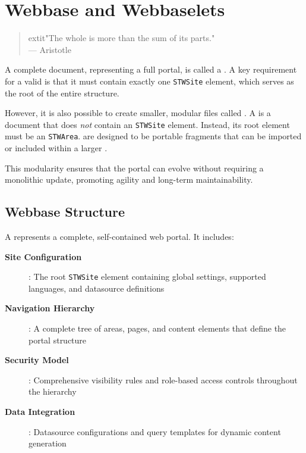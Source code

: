 
\chapter{Webbase and Webbaselets}
\label{chap:webbaselets}

\begin{quote}
	extit{"The whole is more than the sum of its parts."} \\
— Aristotle
\end{quote}

A complete \wbdl{} document, representing a full portal, is called a \textbf{\webbase{}}. A key requirement for a valid \webbase{} is that it must contain exactly one \texttt{STWSite} element, which serves as the root of the entire structure.

However, it is also possible to create smaller, modular \wbdl{} files called \textbf{}. A \webbaselet{} is a \wbdl{} document that does \emph{not} contain an \texttt{STWSite} element. Instead, its root element must be an \texttt{STWArea}.  are designed to be portable fragments that can be imported or included within a larger \webbase{}.

This modularity ensures that the portal can evolve without requiring a monolithic update, promoting agility and long-term maintainability.

\section{Webbase Structure}
\label{sec:webbase-structure}

A \webbase{} represents a complete, self-contained web portal. It includes:

\begin{description}
\item[\textbf{Site Configuration}]: The root \texttt{STWSite} element containing global settings, supported languages, and datasource definitions
\item[\textbf{Navigation Hierarchy}]: A complete tree of areas, pages, and content elements that define the portal structure
\item[\textbf{Security Model}]: Comprehensive visibility rules and role-based access controls throughout the hierarchy
\item[\textbf{Data Integration}]: Datasource configurations and query templates for dynamic content generation
\end{description}

